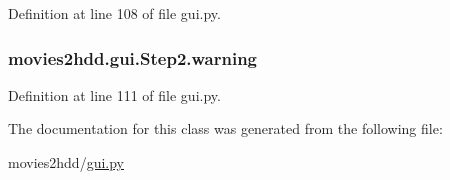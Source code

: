 Definition at line 108 of file gui.\-py.

\hypertarget{classmovies2hdd_1_1gui_1_1_step2_a87c68120beaf76279360a47159d5c7aa}{
\subsubsection[{warning}]{\setlength{\rightskip}{0pt plus 5cm}movies2hdd.\-gui.\-Step2.\-warning}}\label{classmovies2hdd_1_1gui_1_1_step2_a87c68120beaf76279360a47159d5c7aa}


Definition at line 111 of file gui.\-py.



The documentation for this class was generated from the following file\-:\begin{DoxyCompactItemize}
\item 
movies2hdd/\hyperlink{gui_8py}{gui.\-py}\end{DoxyCompactItemize}
